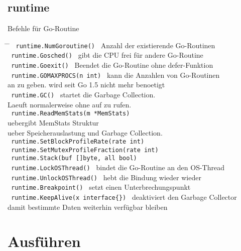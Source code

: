 \documentclass[twoside,a4paper,12pt]{article}
\begin{document}
\subsection{runtime}
Befehle für Go-Routine \label{sec:runtime}
\begin{tabbing}
 \hspace{2mm} \= \hspace{70mm} \= \kill
 \> \verb| runtime.NumGoroutine() | \> Anzahl der existierende Go-Routinen \\ 
 \> \verb| runtime.Gosched() | \> gibt die CPU frei für andere Go-Routine \\ 
 \> \verb| runtime.Goexit() | \> Beendet die Go-Routine ohne defer-Funktion \\ 
 \> \verb| runtime.GOMAXPROCS(n int) | \> kann die Anzahlen von Go-Routinen \\
 \> \> an zu geben. wird seit Go 1.5 nicht mehr benoetigt\\ 
 \> \verb| runtime.GC() | \> startet die Garbage Collection. \\ 
 \> \> Laeuft normalerweise ohne auf zu rufen. \\ 
 \> \verb| runtime.ReadMemStats(m *MemStats) | \\ 
 \> \> uebergibt MemStats Struktur \\ 
 \> \> ueber Speicherauslastung und Garbage Collection. \\ 
 \> \verb| runtime.SetBlockProfileRate(rate int) | \\ 
 \> \verb| runtime.SetMutexProfileFraction(rate int) | \\ 
 \> \verb| runtime.Stack(buf []byte, all bool) | \\ 
 \> \verb| runtime.LockOSThread() | \> bindet die Go-Routine an den OS-Thread \\
 \> \verb| runtime.UnlockOSThread() | \> hebt die Bindung wieder wieder \\ 
 \> \verb| runtime.Breakpoint() | \> setzt einen Unterbrechungspunkt \\ 
 \> \verb| runtime.KeepAlive(x interface{}) | \> deaktiviert den Garbage Collector \\ 
 \> \> damit bestimmte Daten weiterhin verfügbar bleiben \\
\end{tabbing}

 \section{Ausführen}
\end{document}
